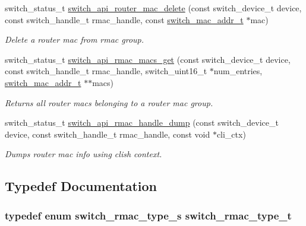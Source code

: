 \begin{DoxyCompactItemize}
switch\+\_\+status\+\_\+t \hyperlink{group__RMAC_gaa3fa84175e62a66f0d84f3073ec4012e}{switch\+\_\+api\+\_\+router\+\_\+mac\+\_\+delete} (const switch\+\_\+device\+\_\+t device, const switch\+\_\+handle\+\_\+t rmac\+\_\+handle, const \hyperlink{structswitch__mac__addr__s}{switch\+\_\+mac\+\_\+addr\+\_\+t} $\ast$mac)
\begin{DoxyCompactList}\small\item\em Delete a router mac from rmac group. \end{DoxyCompactList}\item 
switch\+\_\+status\+\_\+t \hyperlink{group__RMAC_ga65818d6ba44406b18ce57063b81eed1b}{switch\+\_\+api\+\_\+rmac\+\_\+macs\+\_\+get} (const switch\+\_\+device\+\_\+t device, const switch\+\_\+handle\+\_\+t rmac\+\_\+handle, switch\+\_\+uint16\+\_\+t $\ast$num\+\_\+entries, \hyperlink{structswitch__mac__addr__s}{switch\+\_\+mac\+\_\+addr\+\_\+t} $\ast$$\ast$macs)
\begin{DoxyCompactList}\small\item\em Returns all router macs belonging to a router mac group. \end{DoxyCompactList}\item 
switch\+\_\+status\+\_\+t \hyperlink{group__RMAC_gac3aefa69d29a9bb7ca4b5a2d540c0b77}{switch\+\_\+api\+\_\+rmac\+\_\+handle\+\_\+dump} (const switch\+\_\+device\+\_\+t device, const switch\+\_\+handle\+\_\+t rmac\+\_\+handle, const void $\ast$cli\+\_\+ctx)
\begin{DoxyCompactList}\small\item\em Dumps router mac info using clish context. \end{DoxyCompactList}\end{DoxyCompactItemize}


\subsection{Typedef Documentation}
\hypertarget{group__RMAC_gaa7deac8b108c4f020a3ef4ad546ade81}{
\subsubsection[{switch\+\_\+rmac\+\_\+type\+\_\+t}]{\setlength{\rightskip}{0pt plus 5cm}typedef enum {\bf switch\+\_\+rmac\+\_\+type\+\_\+s}  {\bf switch\+\_\+rmac\+\_\+type\+\_\+t}}}\label{group__RMAC_gaa7deac8b108c4f020a3ef4ad546ade81}


